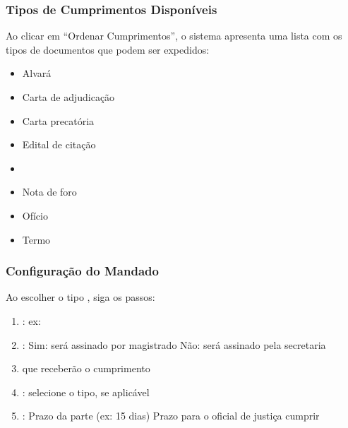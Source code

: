 \documentclass[letterpaper,10pt,brazil]{sphinxmanual}
\begin{document}
\subsubsection{Tipos de Cumprimentos Disponíveis}
\label{\detokenize{projud_32_expedicaomandado:tipos-de-cumprimentos-disponiveis}}
\sphinxAtStartPar
Ao clicar em “Ordenar Cumprimentos”, o sistema apresenta uma lista com os tipos de documentos que podem ser expedidos:
\begin{itemize}
\item {} 
\sphinxAtStartPar
Alvará

\item {} 
\sphinxAtStartPar
Carta de adjudicação

\item {} 
\sphinxAtStartPar
Carta precatória

\item {} 
\sphinxAtStartPar
Edital de citação

\item {} 
\sphinxAtStartPar
{}

\item {} 
\sphinxAtStartPar
Nota de foro

\item {} 
\sphinxAtStartPar
Ofício

\item {} 
\sphinxAtStartPar
Termo

\end{itemize}


\subsubsection{Configuração do Mandado}
\label{\detokenize{projud_32_expedicaomandado:configuracao-do-mandado}}
\sphinxAtStartPar
Ao escolher o tipo , siga os passos:
\begin{enumerate}
%
\item {} 
\sphinxAtStartPar
{}: ex: 

\item {} 
\sphinxAtStartPar
{}:
\sphinxhyphen{} Sim: será assinado por magistrado
\sphinxhyphen{} Não: será assinado pela secretaria

\item {} 
\sphinxAtStartPar
{} que receberão o cumprimento

\item {} 
\sphinxAtStartPar
{}: selecione o tipo, se aplicável

\item {} 
\sphinxAtStartPar
{}:
\sphinxhyphen{} Prazo da parte (ex: 15 dias)
\sphinxhyphen{} Prazo para o oficial de justiça cumprir

\end{enumerate}
\end{document}
